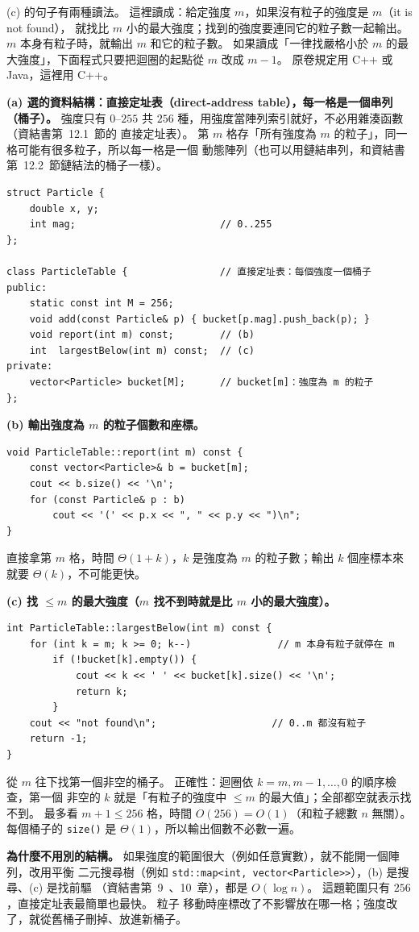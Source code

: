 \begin{pastsoln}
(c) 的句子有兩種讀法。 這裡讀成：給定強度 $m$，如果沒有粒子的強度是 $m$（it is not found），
就找比 $m$ 小的最大強度；找到的強度要連同它的粒子數一起輸出。 $m$ 本身有粒子時，就輸出 $m$
和它的粒子數。 如果讀成「一律找嚴格小於 $m$ 的最大強度」，下面程式只要把迴圈的起點從 $m$ 改成
$m - 1$。 原卷規定用 C++ 或 Java，這裡用 C++。

\textbf{(a) 選的資料結構：直接定址表（direct-address table），每一格是一個串列（桶子）。}
強度只有 $0$--$255$ 共 $256$ 種，用強度當陣列索引就好，不必用雜湊函數（資結書第~12.1~節的
直接定址表）。 第 $m$ 格存「所有強度為 $m$ 的粒子」，同一格可能有很多粒子，所以每一格是一個
動態陣列（也可以用鏈結串列，和資結書第~12.2~節鏈結法的桶子一樣）。
\begin{verbatim}
struct Particle {
    double x, y;
    int mag;                         // 0..255
};

class ParticleTable {                // 直接定址表：每個強度一個桶子
public:
    static const int M = 256;
    void add(const Particle& p) { bucket[p.mag].push_back(p); }
    void report(int m) const;        // (b)
    int  largestBelow(int m) const;  // (c)
private:
    vector<Particle> bucket[M];      // bucket[m]：強度為 m 的粒子
};

\end{verbatim}

\textbf{(b) 輸出強度為 $m$ 的粒子個數和座標。}
\begin{verbatim}
void ParticleTable::report(int m) const {
    const vector<Particle>& b = bucket[m];
    cout << b.size() << '\n';
    for (const Particle& p : b)
        cout << '(' << p.x << ", " << p.y << ")\n";
}
\end{verbatim}
直接拿第 $m$ 格，時間 $\Theta(1 + k)$，$k$ 是強度為 $m$ 的粒子數；輸出 $k$ 個座標本來就要
$\Theta(k)$，不可能更快。

\textbf{(c) 找 $\le m$ 的最大強度（$m$ 找不到時就是比 $m$ 小的最大強度）。}
\begin{verbatim}
int ParticleTable::largestBelow(int m) const {
    for (int k = m; k >= 0; k--)               // m 本身有粒子就停在 m
        if (!bucket[k].empty()) {
            cout << k << ' ' << bucket[k].size() << '\n';
            return k;
        }
    cout << "not found\n";                    // 0..m 都沒有粒子
    return -1;
}
\end{verbatim}
從 $m$ 往下找第一個非空的桶子。 正確性：迴圈依 $k = m, m-1, \ldots, 0$ 的順序檢查，第一個
非空的 $k$ 就是「有粒子的強度中 $\le m$ 的最大值」；全部都空就表示找不到。 最多看 $m + 1 \le
256$ 格，時間 $O(256) = O(1)$（和粒子總數 $n$ 無關）。 每個桶子的 \texttt{size()} 是
$\Theta(1)$，所以輸出個數不必數一遍。

\textbf{為什麼不用別的結構。} 如果強度的範圍很大（例如任意實數），就不能開一個陣列，改用平衡
二元搜尋樹（例如 \texttt{std::map<int, vector<Particle>>}），(b) 是搜尋、(c) 是找前驅
（資結書第~9~、10~章），都是 $O(\log n)$。 這題範圍只有 $256$，直接定址表最簡單也最快。 粒子
移動時座標改了不影響放在哪一格；強度改了，就從舊桶子刪掉、放進新桶子。
\end{pastsoln}
